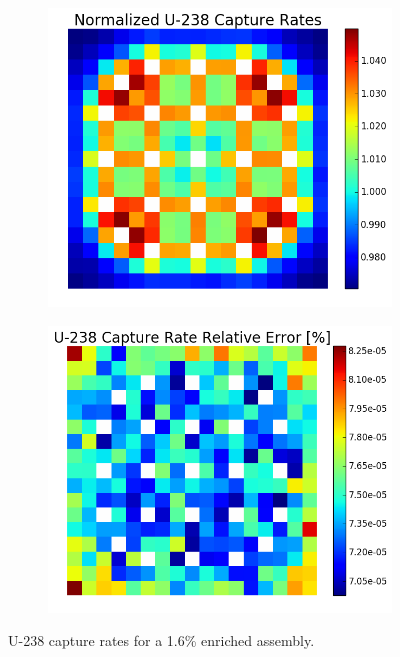 \begin{figure}[h!]
\centering
\begin{subfigure}{0.44\textwidth}
  \centering
  \includegraphics[width=\linewidth]{figures/benchmarks/capture-rates/capt-mean-fuel-16}
  \caption{}
  \label{fig:chap7-capt-rate-mean-1.6-assm}
\end{subfigure}%
\begin{subfigure}{0.44\textwidth}
  \centering
  \includegraphics[width=\linewidth]{figures/benchmarks/capture-rates/capt-rel-err-fuel-16}
  \caption{}
  \label{fig:chap7-capt-rate-rel-err-1.6-assm}
\end{subfigure}%
\caption[U-238 capture rates for a 1.6\% enriched assembly]{U-238 capture rates for a 1.6\% enriched assembly.}
\label{fig:chap7-capt-rates-1.6-assm}
\end{figure}

